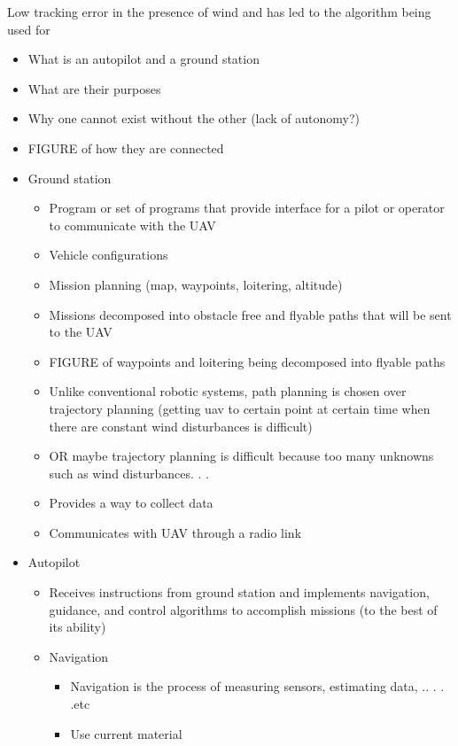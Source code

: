 \documentclass[numbered,pdftex]{ohio-etd}
\begin{document}
Low tracking error in the presence of wind and has led to the algorithm being used for 

\begin{itemize}
	\item What is an autopilot and a ground station
	\item What are their purposes
	\item Why one cannot exist without the other (lack of autonomy?)
	\item FIGURE of how they are connected
	
	\item Ground station 
	\begin{itemize}
		\item Program or set of programs that provide interface for a pilot or operator to communicate with the UAV
		\item Vehicle configurations
		\item Mission planning (map, waypoints, loitering, altitude)
		\item Missions decomposed into obstacle free and flyable paths that will be sent to the UAV
		\item FIGURE of waypoints and loitering being decomposed into flyable paths
		\item Unlike conventional robotic systems, path planning is chosen over trajectory planning (getting uav to certain point at certain time when there are constant wind disturbances is difficult)
		\item OR maybe trajectory planning is difficult because too many unknowns such as wind disturbances. . .
		\item Provides a way to collect data
		\item Communicates with UAV through a radio link
	\end{itemize}

	\item Autopilot
	\begin{itemize}
		
		
		\item Receives instructions from ground station and implements navigation, guidance, and control algorithms to accomplish missions (to the best of its ability)
		
		\item Navigation
		\begin{itemize}
			\item Navigation is the process of measuring sensors, estimating data, .. . . .etc
		 	\item Use current material 
		\end{itemize}
	

\end{itemize}
\end{itemize}
\end{document}
